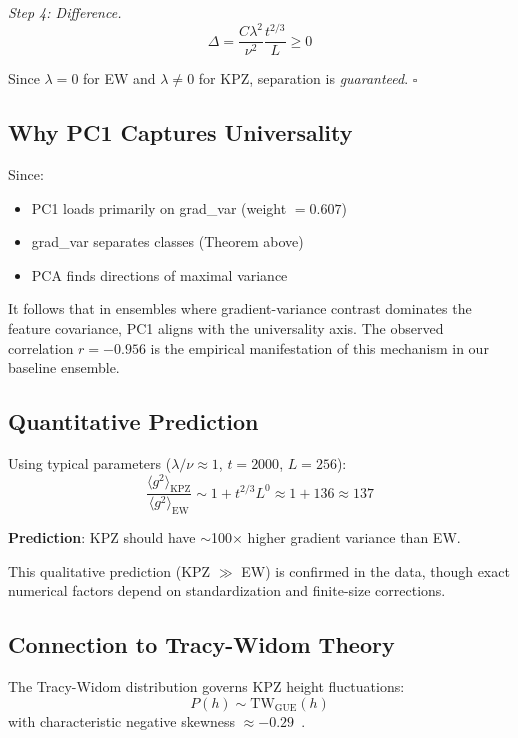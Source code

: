 \documentclass[aps,pre,twocolumn,superscriptaddress,showpacs]{revtex4-2}
\begin{document}
\emph{Step 4: Difference.}
\begin{equation}
\Delta = \frac{C\lambda^2}{\nu^2} \frac{t^{2/3}}{L} \geq 0
\end{equation}

Since $\lambda = 0$ for EW and $\lambda \neq 0$ for KPZ, separation is \emph{guaranteed}. $\square$

\subsection{Why PC1 Captures Universality}

Since:
\begin{itemize}
\item PC1 loads primarily on grad\_var (weight $= 0.607$)
\item grad\_var separates classes (Theorem above)
\item PCA finds directions of maximal variance
\end{itemize}

It follows that in ensembles where gradient-variance contrast dominates the feature covariance, PC1 aligns with the universality axis. The observed correlation $r = -0.956$ is the empirical manifestation of this mechanism in our baseline ensemble.

\subsection{Quantitative Prediction}

Using typical parameters ($\lambda/\nu \approx 1$, $t = 2000$, $L = 256$):
\begin{equation}
\frac{\langle g^2 \rangle_{\text{KPZ}}}{\langle g^2 \rangle_{\text{EW}}} \sim 1 + t^{2/3} L^0 \approx 1 + 136 \approx 137
\end{equation}

\textbf{Prediction}: KPZ should have $\sim$100$\times$ higher gradient variance than EW.

This qualitative prediction (KPZ $\gg$ EW) is confirmed in the data, though exact numerical factors depend on standardization and finite-size corrections.

\subsection{Connection to Tracy-Widom Theory}

The Tracy-Widom distribution governs KPZ height fluctuations:
\begin{equation}
P(h) \sim \text{TW}_{\text{GUE}}(h)
\end{equation}
with characteristic negative skewness $\approx -0.29$~\cite{Tracy1994,Corwin2012}.
\end{document}
